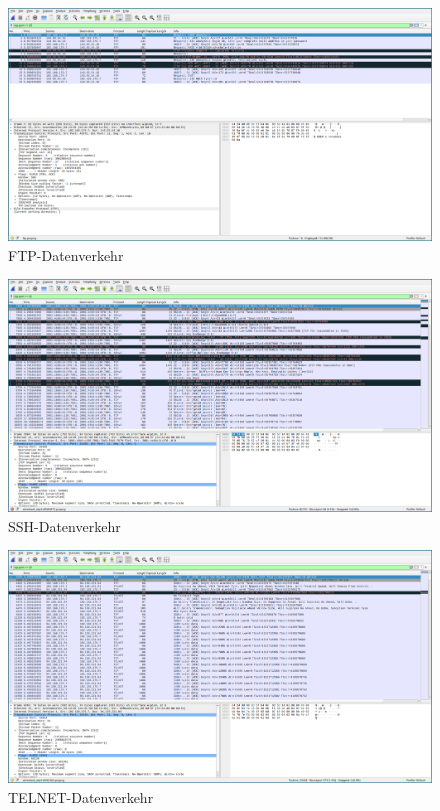 \begin{figure}[p]
    \centering
    \includegraphics[width=1\textwidth]{./assets/5.1.a.ftp.png}
    \caption{FTP-Datenverkehr}
    \label{fig:5.1.a.ftp}
\end{figure}

\begin{figure}[p]
    \centering
    \includegraphics[width=1\textwidth]{./assets/5.1.a.ssh.png}
    \caption{SSH-Datenverkehr}
    \label{fig:5.1.a.ssh}
\end{figure}

\FloatBarrier

\begin{figure}[p]
    \centering
    \includegraphics[width=1\textwidth]{./assets/5.1.a.telnet.png}
    \caption{TELNET-Datenverkehr}
    \label{fig:5.1.a.telnet}
\end{figure}

